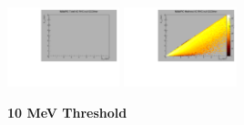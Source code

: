 \begin{center}
  \includegraphics[width=0.245\textwidth]{plots/response_matrix/Total_RHC_CCOther_null.pdf}
  \includegraphics[width=0.245\textwidth]{plots/response_matrix/Hadrons_RHC_CCOther_null.pdf}

\end{center}

\textbf{10 MeV Threshold}


